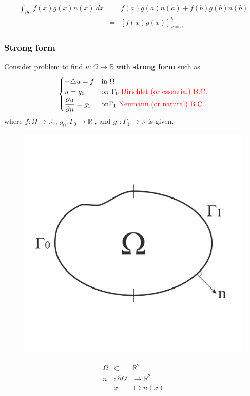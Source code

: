 \documentclass[a4paper,10pt]{article}
\begin{document}
\begin{eqnarray}\nonumber
\int_{\partial \Omega} f(x) g(x) n(x) \ dx & = & f(a)g(a)n(a) + f(b)g(b)n(b) \\ \nonumber
& = & [f(x)g(x)]_{x=a}^{b}
\end{eqnarray}


\subsubsection{Strong form}
Consider problem to find $ u : \Omega \rightarrow \mathbb{R} $ with \textbf{strong form} such as 
\begin{equation}\label{strong_form}
\begin{cases}
-\triangle u = f & \text{in } \Omega\\
u = g_{0} & \text{on } \Gamma_{0} \ \text{\textcolor{red}{Dirichlet (or essential) B.C.}} \\
\dfrac{\partial u }{\partial n} = g_{1} & \text{on} \Gamma_{1} \ \text{\textcolor{red}{Neumann (or natural) B.C. }}
\end{cases}
\end{equation}
where $ f : \Omega \rightarrow \mathbb{R} $ , $ g_{0} : \Gamma_{0} \rightarrow \mathbb{R} $ , and $ g_{1} : \Gamma_{1} \rightarrow \mathbb{R} $ is given.

\begin{figure}[h!]
	\centering
	\includegraphics[width=0.5\linewidth]{picture/strongproblem}
	\caption{}
	\label{fig:strongproblem}
\end{figure}

\begin{eqnarray}\nonumber
\Omega &\subset &\mathbb{R}^2 \\ \nonumber
n &: \partial \Omega &\rightarrow \mathbb{R}^2 \\ \nonumber
&x &\mapsto n(x)
\end{eqnarray}
\end{document}
